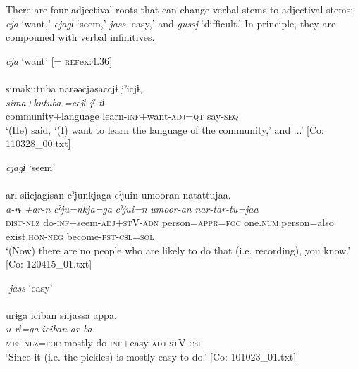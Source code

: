 There are four adjectival roots that can change verbal stems to adjectival stems: \textit{cja} ‘want,’ \textit{cjagɨ} ‘seem,’ \textit{jass} ‘easy,’ and \textit{gussj} ‘difficult.’ In principle, they are compouned with verbal infinitives.

\ea \label{ex:4.59} \ea  \textit{cja} ‘want’ [= \textsc{ref}{ex:4.36}] \label{ex:4.59a}\\\\
  \glll    simakutuba   narəəcjasaccjɨ  jˀicjɨ,\\
      \textit{sima+kutuba}  \textit{=ccjɨ}  \textit{jˀ-tɨ}\\
      community+language  learn-\textsc{inf}+want-\textsc{adj}=\textsc{qt}  say-\textsc{seq}\\
      \glt       ‘(He) said, ‘(I) want to learn the language of the community,’ and ...’ [Co: 110328\_00.txt]

\ex  \textit{cjagɨ} ‘seem’\\\\
     \glll arɨ  siicjagɨsan  cˀjunkjaga    cˀjuin  umooran  natattujaa.\\
      \textit{a-rɨ}  \textit{+ar-n}  \textit{cˀju=nkja=ga}   \textit{cˀjui=n}  \textit{umoor-an}  \textit{nar-tar-tu=jaa}\\                                                                          
      \textsc{dist}-\textsc{nlz}  do-\textsc{inf}+seem-\textsc{adj}+\textsc{st}V-\textsc{adn}  person=\textsc{appr}=\textsc{foc}                   one.\textsc{num}.person=also  exist.\textsc{hon}-\textsc{neg}  become-\textsc{pst}-\textsc{csl}=\textsc{sol}\\
     \glt  ‘(Now) there are no people who are likely to do that (i.e. recording), you know.’   [Co: 120415\_01.txt]

\ex \textit{{}-jass} ‘easy’\\\\
    \glll     urɨga  {\textbar}iciban{\textbar}  siijassa  appa.\\
      \textit{u-rɨ=ga}  \textit{iciban}  \textit{}  \textit{ar-ba}\\
      \textsc{mes}-\textsc{nlz}=\textsc{foc}  mostly  do-\textsc{inf}+easy-\textsc{adj}  \textsc{st}V-\textsc{csl}\\
      \glt       ‘Since it (i.e. the pickles) is mostly easy to do.’ [Co: 101023\_01.txt]

